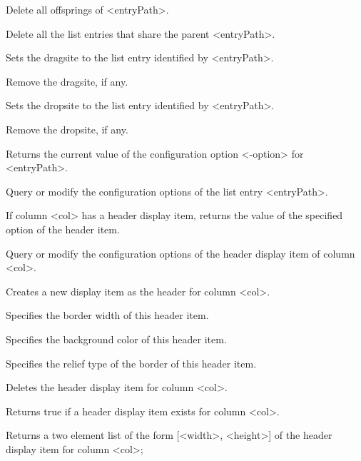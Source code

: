 \begin{enum}{1cm}
Delete all offsprings of <entryPath>.

Delete all the list entries that share the parent <entryPath>.

Sets the dragsite to the list entry identified by <entryPath>.

Remove the dragsite, if any.

Sets the dropsite to the list entry identified by <entryPath>.

Remove the dropsite, if any.

Returns the current value of the configuration option <-option> for <entryPath>.

Query or modify the configuration options of the list entry <entryPath>.

If column <col> has a header display item, returns the value of the specified option of the header item. 

Query or modify the configuration options of the header display item of column <col>.

Creates a new display item as the header for column <col>.

Specifies the border width of this header item. 

Specifies the background color of this header item. 

Specifies the relief type of the border of this header item. 

Deletes the header display item for column <col>. 

Returns true if a header display item exists for column <col>.

Returns a two element list of the form [<width>, <height>] of the header display item for column <col>;


\end{enum}
